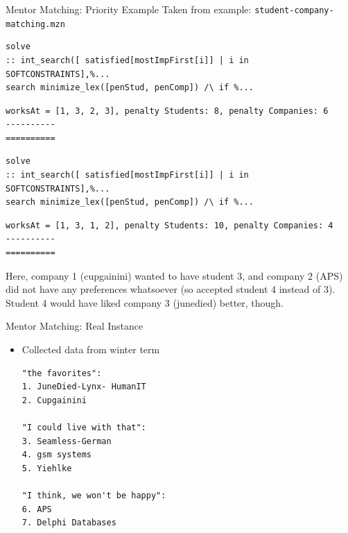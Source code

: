 \documentclass[10pt,xcolor={dvipsnames},fleqn]{beamer}
\begin{document}
\begin{frame}[fragile]{Mentor Matching: Priority Example}
Taken from example: \texttt{student-company-matching.mzn}
\begin{lstlisting}
solve 
:: int_search([ satisfied[mostImpFirst[i]] | i in SOFTCONSTRAINTS],%... 
search minimize_lex([penStud, penComp]) /\ if %...
\end{lstlisting}

\small
\begin{verbatim}
worksAt = [1, 3, 2, 3], penalty Students: 8, penalty Companies: 6
----------
==========
\end{verbatim}

\begin{lstlisting}
solve 
:: int_search([ satisfied[mostImpFirst[i]] | i in SOFTCONSTRAINTS],%... 
search minimize_lex([penStud, penComp]) /\ if %...
\end{lstlisting}

\small
\begin{verbatim}
worksAt = [1, 3, 1, 2], penalty Students: 10, penalty Companies: 4
----------
==========
\end{verbatim}
Here, company 1 (cupgainini) wanted to have student 3, and company 2 (APS) did not have any preferences whatsoever (so accepted student 4 instead of 3). Student 4 would have liked company 3 (junedied) better, though.
\end{frame}

\begin{frame}[fragile]{Mentor Matching: Real Instance}
\begin{itemize}
\item Collected data from winter term

\begin{parchment}
\begin{verbatim}
"the favorites":
1. JuneDied-Lynx- HumanIT
2. Cupgainini
 
"I could live with that":
3. Seamless-German
4. gsm systems
5. Yiehlke
 
"I think, we won't be happy":
6. APS
7. Delphi Databases
\end{verbatim} 
\end{parchment}
\end{itemize}
\end{frame}
\end{document}
